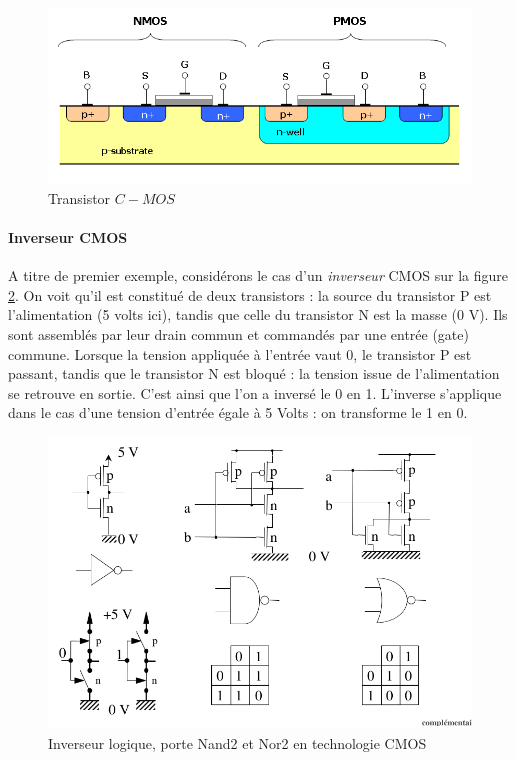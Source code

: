 \begin{figure}[htb]
\begin{center}
\includegraphics[scale=0.4]{figures/Cmos_impurity_profile.PNG}
\caption{Transistor $C-MOS$}
\label{cmos1}
\end{center}
\end{figure}

\paragraph{Inverseur CMOS}

A titre de premier exemple, considérons le cas d'un {\it inverseur} CMOS sur la figure \ref{cmos2}. On voit qu'il est constitué de deux transistors : la source du transistor P est l'alimentation (5 volts ici),  tandis que celle
du transistor N est la masse (0 V). Ils sont assemblés par leur drain commun et commandés par une entrée (gate) commune.
Lorsque la tension appliquée à l'entrée vaut 0, le transistor P est passant, tandis que le transistor
N est bloqué : la tension issue de l'alimentation se retrouve en sortie. C'est ainsi que l'on a inversé le 0 en 1.
L'inverse s'applique dans le cas d'une tension d'entrée égale à 5 Volts : on transforme le 1 en 0.

\begin{figure}[htb]
  \begin{center}
    \includegraphics[scale=0.4]{figures/complementaire_2.png}
    \caption{Inverseur logique, porte Nand2 et Nor2 en technologie CMOS}
    \label{cmos2}
  \end{center}
\end{figure}

